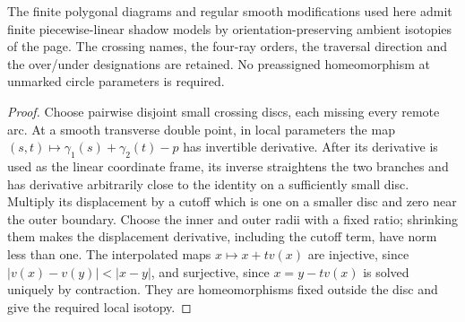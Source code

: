 \begin{lemma}\label{lem:gauss-pl-model}
The finite polygonal diagrams and regular smooth modifications used here
admit finite piecewise-linear shadow models by orientation-preserving
ambient isotopies of the page. The crossing names, the four-ray orders,
the traversal direction and the over/under designations are retained.
No preassigned homeomorphism at unmarked circle parameters is required.
\end{lemma}
\begin{proof}
Choose pairwise disjoint small crossing discs, each missing every remote
arc. At a smooth transverse double point, in local parameters the map
$(s,t)\mapsto\gamma_1(s)+\gamma_2(t)-p$ has invertible derivative.
After its derivative is used as the linear coordinate frame, its inverse
straightens the two branches and has derivative arbitrarily close to the
identity on a sufficiently small disc. Multiply its displacement by a
cutoff which is one on a smaller disc and zero near the outer boundary.
Choose the inner and outer radii with a fixed ratio; shrinking them makes
the displacement derivative, including the cutoff term, have norm less
than one. The interpolated maps $x\mapsto x+t v(x)$ are injective,
since $|v(x)-v(y)|<|x-y|$, and surjective, since
$x=y-tv(x)$ is solved uniquely by contraction. They are homeomorphisms
fixed outside the disc and give the required local isotopy.


\end{proof}

